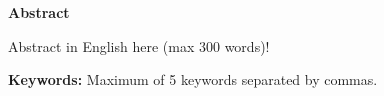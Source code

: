 \vspace*{2cm}
\begin{center}
\Large \bf Abstract
\end{center}
\vspace*{1cm} \setlength{\baselineskip}{0.6cm}

Abstract in English here (max 300 words)!

\vfill

\begin{flushleft}
\textbf{Keywords:}
Maximum of 5 keywords separated by commas.
\end{flushleft}
